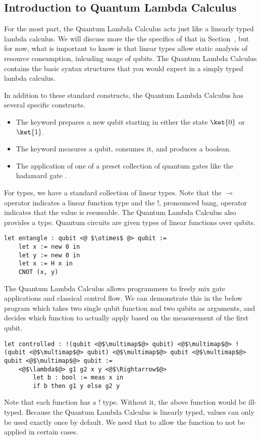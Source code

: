 \subsection{Introduction to Quantum Lambda Calculus}
For the most part, the Quantum Lambda Calculus acts just like a linearly typed lambda calculus.
We will discuss more the the specifics of that in Section~, but for now, what is important to know is that linear types allow static analysis of resource consumption, inlcuding usage of qubits.
The Quantum Lambda Calculus contains the basic syntax structures that you would expect in a simply typed lambda calculus.


In addition to these standard constructs, the Quantum Lambda Calculus has several specific constructs.
\begin{itemize}
\item The  keyword prepares a new qubit starting in either the state $\ket{0}$ or $\ket{1}$.
\item The  keyword measures a qubit, consumes it, and produces a boolean.
\item The application of one of a preset collection of quantum gates  like the hadamard gate .
\end{itemize}

For types, we have a standard collection of linear types.
Note that the $\multimap$ operator indicates a linear function type and the $!$, pronounced bang, operator indicates that the value is resuseable.
The Quantum Lambda Calculus also provides a  type.
Quantum circuits are given types of linear functions over qubits.

\begin{lstlisting}[style=customcoq]
let entangle : qubit <@ $\otimes$ @> qubit :=
    let x := new 0 in
    let y := new 0 in
    let x := H x in
    CNOT (x, y)
\end{lstlisting}

The Quantum Lambda Calculus allows programmers to freely mix gate applications and classical control flow.
We can demonstrate this in the below program which takes two single qubit function nad two qubits as arguments, and decides which function to actually apply based on the measurement of the first qubit.
\begin{lstlisting}[style=customcoq]
let controlled : !(qubit <@$\multimap$@> qubit) <@$\multimap$@> !(qubit <@$\multimap$@> qubit) <@$\multimap$@> qubit <@$\multimap$@> qubit <@$\multimap$@> qubit :=
    <@$\lambda$@> g1 g2 x y <@$\Rightarrow$@>
        let b : bool := meas x in
        if b then g1 y else g2 y
\end{lstlisting}
Note that each function has a $!$ type.
Without it, the above function would be ill-typed.
Because the Quantum Lambda Calculus is linearly typed, values can only be used exactly once by default.
We need that to allow the function to not be applied in certain cases.

